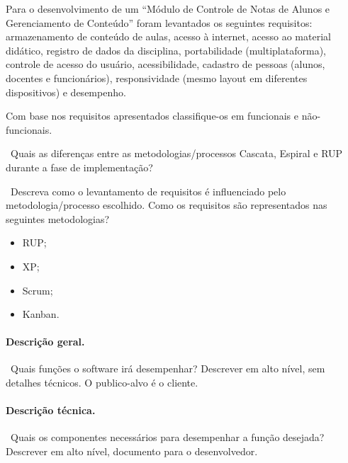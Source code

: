  Para o desenvolvimento de um ``Módulo de Controle de
Notas de Alunos e Gerenciamento de Conteúdo'' foram levantados os
seguintes requisitos: armazenamento de conteúdo de aulas, acesso à
internet, acesso ao material didático, registro de dados da
disciplina, portabilidade (multiplataforma), controle de acesso do
usuário, acessibilidade, cadastro de pessoas (alunos, docentes e
funcionários), responsividade (mesmo layout em diferentes
dispositivos) e desempenho.

\noindent Com base nos requisitos apresentados classifique-os em
funcionais e não-funcionais.

\question{}~Quais as diferenças entre as metodologias/processos
Cascata, Espiral e RUP durante a fase de implementação?

\question{}~Descreva como o levantamento de requisitos é influenciado
pelo metodologia/processo escolhido. Como os requisitos são representados
nas seguintes metodologias?
\begin{itemize}
\item RUP;
\item XP;
\item Scrum;
\item Kanban.
\end{itemize}


\paragraph{Descrição geral.}~Quais funções o software irá desempenhar?
Descrever em alto nível, sem detalhes técnicos. O publico-alvo é o
cliente.

\paragraph{Descrição técnica.}~Quais os componentes necessários para
desempenhar a função desejada? Descrever em alto nível, documento para
o desenvolvedor.

